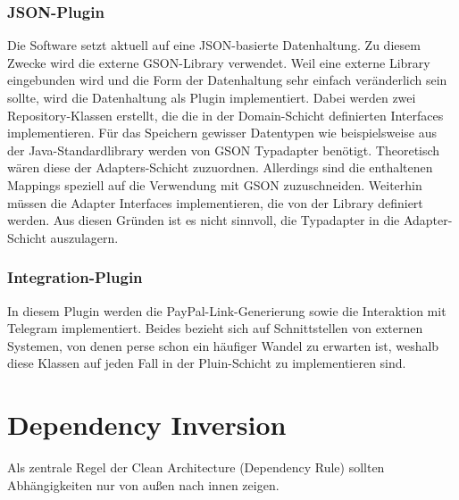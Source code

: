 \subsubsection{JSON-Plugin}
Die Software setzt aktuell auf eine JSON-basierte Datenhaltung.
Zu diesem Zwecke wird die externe GSON-Library verwendet.
Weil eine externe Library eingebunden wird und die Form der Datenhaltung sehr einfach veränderlich sein sollte, wird die Datenhaltung als Plugin implementiert.
Dabei werden zwei Repository-Klassen erstellt, die die in der Domain-Schicht definierten Interfaces implementieren.
Für das Speichern gewisser Datentypen wie beispielsweise  aus der Java-Standardlibrary werden von GSON Typadapter benötigt.
Theoretisch wären diese der Adapters-Schicht zuzuordnen.
Allerdings sind die enthaltenen Mappings speziell auf die Verwendung mit GSON zuzuschneiden.
Weiterhin müssen die Adapter Interfaces implementieren, die von der Library definiert werden.
Aus diesen Gründen ist es nicht sinnvoll, die Typadapter in die Adapter-Schicht auszulagern.

\subsubsection{Integration-Plugin}
In diesem Plugin werden die PayPal-Link-Generierung sowie die Interaktion mit Telegram implementiert.
Beides bezieht sich auf Schnittstellen von externen Systemen, von denen perse schon ein häufiger Wandel zu erwarten ist, weshalb diese Klassen auf jeden Fall in der Pluin-Schicht zu implementieren sind.

\section{Dependency Inversion}
Als zentrale Regel der Clean Architecture (Dependency Rule) sollten Abhängigkeiten nur von außen nach innen zeigen.